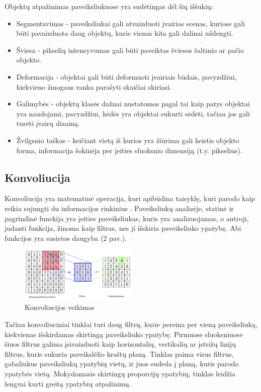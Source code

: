 \documentclass{VUMIFPSkursinis}
\begin{document}
Objektų atpažinimas paveiksliukuose yra sudėtingas dėl šių iššukių:
\begin{itemize}
\item Segmentavimas - paveiksliukai gali atvaizduoti įvairias scenas, kuriose gali būti pavaizduota daug objektų, kurie vienas kita gali dalinai uždengti.
\item Šviesa - pikselių intensyvumas gali būti paveiktas šviesos šaltinio ar pačio objekto.
\item Deformacija - objektai gali būti deformuoti įvairiais būdais, pavyzdžiui, kiekvieno žmogaus ranka parašyti skaičiai skiriasi.
\item Galimybės - objektų klasės dažnai nustatomos pagal tai kaip patys objektai yra naudojami, pavyzdžiui, kėdės yra objektai sukurti sėdėti, tačiau jos gali turėti įvairų dizainą.
\item Žvilgsnio taškas - keičiant vietą iš kurios yra žiūrima gali keistis objekto forma, informacija šokinėja per įeities sluoksnio dimensiją (t.y. pikselius). 
\end{itemize}

\subsection{Konvoliucija}
Konvoliucija yra matematinė operacija, kuri apibūdina taisyklę, kuri parodo kaip reikia sujungti du informacijos rinkinius \cite{Convolution-book}. 
Paveiksliukų analizėje, statinė ir pagrindinė funckija yra įeities paveiksliukas, kuris yra analizuojamas, o antroji, judanti funkcija, žinoma 
kaip filtras, nes ji išskiria paveiksliuko ypatybę. Abi funkcijos yra susietos daugyba (2 pav.). 

\begin{figure}[h]
\centering
\includegraphics[width=0.5\textwidth]{img/Konvoliucija.png}
\caption{Konvoliucijos veikimas}
\end{figure}

Tačiau konvoliuciniai tinklai turi daug filtrų, kurie pereina per vieną paveiksliuką, kiekvienas išskirdamas skirtingą paveiksliuko ypatybę.
Pirmuose sluoksniuose šiuos filtrus galima įsivaizduoti kaip horizontalių, vertikalių ar įstrižų linijų filtrus, kurie sukuria paveikslėlio 
kraštų planą. Tinklas paima visus filtrus, gabaliukus paveiksliukų ypatybių vietų, ir juos sudeda į planą, kuris parodo ypatybės vietą. 
Mokydamasis skirtingų proporcijų ypatybių, tinklas leidžia lengvai kurti greitą ypatybių atpažinimą.
\end{document}
